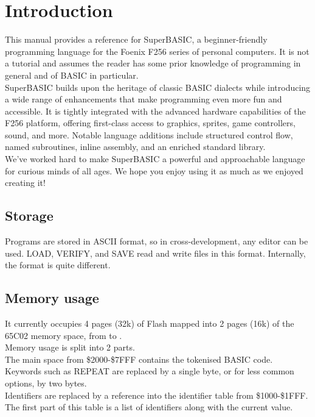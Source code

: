 \chapter{Introduction}

This manual provides a reference for SuperBASIC, a beginner-friendly programming language for the Foenix F256 series of personal computers. It is not a tutorial and assumes the reader has some prior knowledge of programming in general and of BASIC in particular.\\

SuperBASIC builds upon the heritage of classic BASIC dialects while introducing a wide range of enhancements that make programming even more fun and accessible. It is tightly integrated with the advanced hardware capabilities of the F256 platform, offering first-class access to graphics, sprites, game controllers, sound, and more. Notable language additions include structured control flow, named subroutines, inline assembly, and an enriched standard library. \\

We’ve worked hard to make SuperBASIC a powerful and approachable language for curious minds of all ages. We hope you enjoy using it as much as we enjoyed creating it!

\section{Storage}

Programs are stored in ASCII format, so in cross-development, any editor can be used. LOAD, VERIFY, and SAVE read and write files in this format. Internally, the format is quite different.

\section{Memory usage}

It currently occupies 4 pages (32k) of Flash mapped into 2 pages (16k) of the 65C02 memory space, from  to .\\

Memory usage is split into 2 parts. \\

The main space from \$2000-\$7FFF contains the tokenised BASIC code. Keywords such as REPEAT are replaced by a single byte, or for less common options, by two bytes.\\ 

Identifiers are replaced by a reference into the identifier table from \$1000-\$1FFF. The first part of this table is a list of identifiers along with the current value.\\

